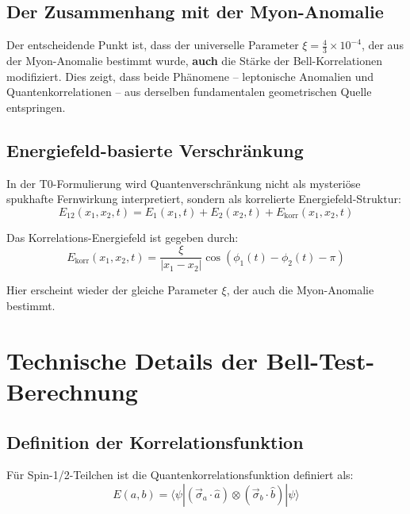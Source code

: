 \documentclass[12pt,a4paper]{article}
\begin{document}
		\subsection{Der Zusammenhang mit der Myon-Anomalie}
		
		Der entscheidende Punkt ist, dass der universelle Parameter $\xi = \frac{4}{3} \times 10^{-4}$, der aus der Myon-Anomalie bestimmt wurde, \textbf{auch} die St\"arke der Bell-Korrelationen modifiziert. Dies zeigt, dass beide Ph\"anomene -- leptonische Anomalien und Quantenkorrelationen -- aus derselben fundamentalen geometrischen Quelle entspringen.
		
		\subsection{Energiefeld-basierte Verschr\"ankung}
		
		In der T0-Formulierung wird Quantenverschr\"ankung nicht als mysteri\"ose spukhafte Fernwirkung interpretiert, sondern als korrelierte Energiefeld-Struktur:
		\begin{equation}
			E_{12}(x_1, x_2, t) = E_1(x_1, t) + E_2(x_2, t) + E_{\text{korr}}(x_1, x_2, t)
		\end{equation}
		
		Das Korrelations-Energiefeld ist gegeben durch:
		\begin{equation}
			E_{\text{korr}}(x_1, x_2, t) = \frac{\xi}{|x_1 - x_2|} \cos(\phi_1(t) - \phi_2(t) - \pi)
		\end{equation}
		
		Hier erscheint wieder der gleiche Parameter $\xi$, der auch die Myon-Anomalie bestimmt.
	
	
	\section{Technische Details der Bell-Test-Berechnung}
	

		\subsection{Definition der Korrelationsfunktion}
		
		F\"ur Spin-1/2-Teilchen ist die Quantenkorrelationsfunktion definiert als:
		\begin{equation}
			E(a,b) = \langle \psi | (\vec{\sigma}_a \cdot \hat{a}) \otimes (\vec{\sigma}_b \cdot \hat{b}) | \psi \rangle
		\end{equation}
		
\end{document}
